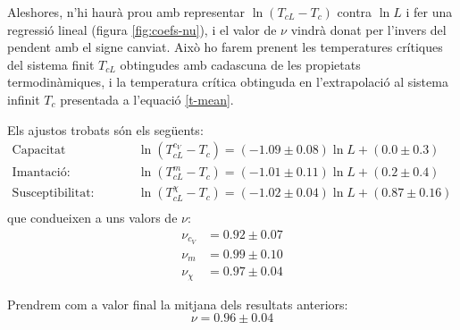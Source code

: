 \documentclass[a4paper]{article}
\begin{document}
Aleshores, n'hi haurà prou amb representar $\ln(T_{cL}-T_c)$ contra $\ln L$ i fer una regressió lineal (figura \ref{fig:coefs-nu}), i el valor de $\nu$ vindrà donat per l'invers del pendent amb el signe canviat. Això ho farem prenent les temperatures crítiques del sistema finit $T_{cL}$ obtingudes amb cadascuna de les propietats termodinàmiques, i la temperatura crítica obtinguda en l'extrapolació al sistema infinit $T_c$ presentada a l'equació \eqref{t-mean}.

Els ajustos trobats són els següents:
\begin{align*}
    \text{Capacitat calorífica:} &\quad \ln \left(T_{cL}^{c_V} - T_c\right) = (-1.09 \pm 0.08) \ln L + (0.0 \pm 0.3) \\
    \text{Imantació:} &\quad \ln \left(T_{cL}^{m} - T_c\right) = (-1.01 \pm 0.11) \ln L + (0.2 \pm 0.4) \\
    \text{Susceptibilitat:} &\quad \ln \left(T_{cL}^{\chi} - T_c\right) = (-1.02 \pm 0.04) \ln L + (0.87 \pm 0.16) \\
\end{align*}
que condueixen a uns valors de $\nu$:
\begin{align*}
	\nu_{c_V} &= 0.92 \pm 0.07 \\
	\nu_m &= 0.99 \pm 0.10 \\
	\nu_\chi &= 0.97 \pm 0.04
\end{align*}

Prendrem com a valor final la mitjana dels resultats anteriors:
\begin{equation} \label{nu}
    \nu = 0.96 \pm 0.04
\end{equation}
\end{document}
